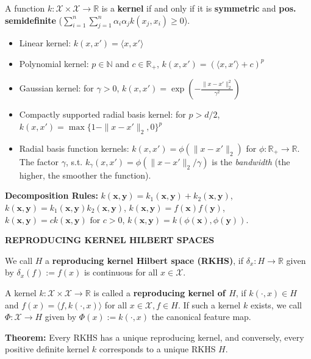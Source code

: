\documentclass[a4paper,10pt]{article}
\newenvironment{myitemize}
{\vspace{-0.25cm}\begin{itemize}}
{\end{itemize}}
\newcommand{\subtitle}[1]{\vspace{0.25cm}\begin{normalsize}\textbf{\textcolor{gray!150}{\uppercase{#1}}}\end{normalsize}}
\begin{document}
\begin{small}
A function $k : \mathcal{X} \times \mathcal{X} \to \mathbb{R}$ is a \textbf{kernel} if and only if it is \textbf{symmetric} and \textbf{pos. semidefinite} ($ \sum_{i=1}^{n} \sum_{j=1}^{n} \alpha_i \alpha_j k(x_j, x_i) \geq 0$).

\begin{myitemize}
    \item Linear kernel: $k(x, x') = \langle x, x' \rangle$
    \item Polynomial kernel: $p \in \mathbb{N}$ and $c \in \mathbb{R}_+$, $k(x, x') = (\langle x, x' \rangle + c)^p$
    \item Gaussian kernel: for $\gamma > 0$, $k(x, x') = \exp\left(-\frac{\|x - x'\|_2^2}{\gamma^2}\right)$
    \item Compactly supported radial basis kernel: for $p > d/2$, $k(x, x') = \max\{1 - \|x - x'\|_2, 0\}^p$
    \item Radial basis function kernels: $k(x, x') = \phi(\|x - x'\|_2)$ for $\phi : \mathbb{R}_+ \to \mathbb{R}$. The factor $\gamma$, s.t. $k_\gamma(x, x') = \phi(\|x - x'\|_2/\gamma)$ is the \textit{bandwidth} (the higher, the smoother the function).
\end{myitemize} 

\textbf{Decomposition Rules:} 
$k(\mathbf{x}, \mathbf{y}) = k_1(\mathbf{x}, \mathbf{y}) + k_2(\mathbf{x}, \mathbf{y})$,
$k(\mathbf{x}, \mathbf{y}) = k_1(\mathbf{x}, \mathbf{y})k_2(\mathbf{x}, \mathbf{y})$,
$k(\mathbf{x}, \mathbf{y}) = f(\mathbf{x}) f(\mathbf{y})$,
$k(\mathbf{x}, \mathbf{y}) = c k(\mathbf{x}, \mathbf{y}) \text{ for } c > 0$,
$k(\mathbf{x}, \mathbf{y}) = k(\phi(\mathbf{x}), \phi(\mathbf{y}))$.

\subtitle{Reproducing kernel Hilbert spaces}

We call $H$ a \textbf{reproducing kernel Hilbert space (RKHS)}, if $\delta_x : H \to \mathbb{R}$ given by $\delta_x(f) := f(x)$ is continuous for all $x \in \mathcal{X}$. 

A kernel $k : \mathcal{X} \times \mathcal{X} \to \mathbb{R}$ is called a \textbf{reproducing kernel of $H$}, if $k(\cdot, x) \in H$ and $f(x) = \langle f, k(\cdot, x) \rangle$ for all $x \in \mathcal{X}, f \in H$. If such a kernel $k$ exists, we call $\Phi : \mathcal{X} \to H$ given by $\Phi(x) := k(\cdot, x)$ the canonical feature map.

\textbf{Theorem:} Every RKHS has a unique reproducing kernel, and conversely, every positive definite kernel $ k $ corresponds to a unique RKHS $ H $.


\end{small}
\end{document}
